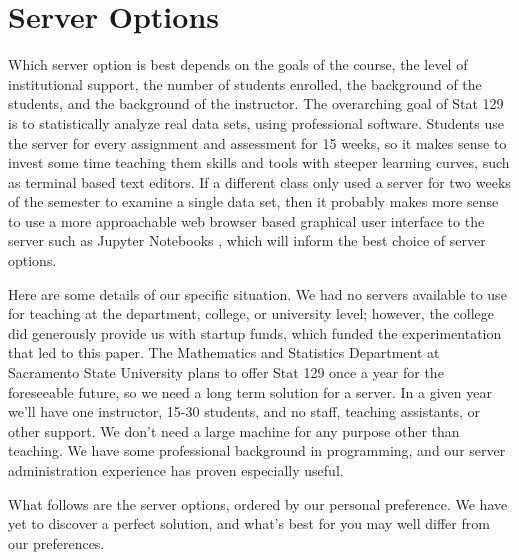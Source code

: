 \documentclass[12pt]{article}
\begin{document}
\section{Server Options}


Which server option is best depends on the goals of the course, the level of institutional support, the number of students enrolled, the background of the students, and the background of the instructor.
The overarching goal of Stat 129 is to statistically analyze real data sets, using professional software.
Students use the server for every assignment and assessment for 15 weeks, so it makes sense to invest some time teaching them skills and tools with steeper learning curves, such as terminal based text editors.
If a different class only used a server for two weeks of the semester to examine a single data set, then it probably makes more sense to use a more approachable web browser based graphical user interface to the server such as Jupyter Notebooks \cite{kluyver2016jupyter}, which will inform the best choice of server options.

Here are some details of our specific situation.
We had no servers available to use for teaching at the department, college, or university level; however, the college did generously provide us with startup funds, which funded the experimentation that led to this paper.
The Mathematics and Statistics Department at Sacramento State University plans to offer Stat 129 once a year for the foreseeable future, so we need a long term solution for a server.
In a given year we'll have one instructor, 15-30 students, and no staff, teaching assistants, or other support.
We don't need a large machine for any purpose other than teaching.
We have some professional background in programming, and our server administration experience has proven especially useful.

What follows are the server options, ordered by our personal preference.
We have yet to discover a perfect solution, and what's best for you may well differ from our preferences.



\end{document}

